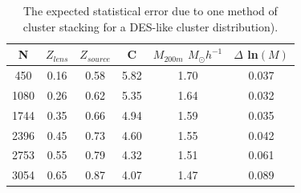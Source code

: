 \begin{table}
        \centering
        \begin{tabular}{|c|c|c|c|c|c|}  
          \hline
          N  &  $Z_{lens}$ & $Z_{source}$  & C & $M_{200m}$ $ M_\odot
          h^{-1}$  & $\Delta$ ln$(M)$ \\ 
          \hline
          450  & 0.16  & 0.58  & 5.82  & 1.70  & 0.037   \\
          \hline
          1080  & 0.26  & 0.62  & 5.35  & 1.64  & 0.032   \\
          \hline
          1744  & 0.35  & 0.66  & 4.94  & 1.59  & 0.035 \\
          \hline   
          2396  & 0.45  & 0.73  & 4.60  & 1.55  & 0.042   \\
          \hline
          2753  & 0.55  & 0.79  & 4.32  & 1.51  & 0.061   \\
          \hline
          3054  & 0.65  & 0.87  & 4.07  & 1.47  & 0.089   \\         
          \hline
        \end{tabular}
        \caption{ The expected statistical error due to one method of
          cluster stacking for a DES-like cluster distribution).}
    \label{table:NFW_1_b}
\end{table}
